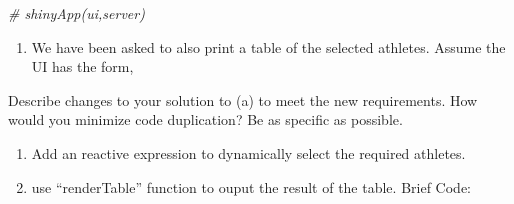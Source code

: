 \documentclass[
]{article}
\newenvironment{Shaded}{\begin{snugshade}}{\end{snugshade}}
\newcommand{\AlertTok}[1]{\textcolor[rgb]{0.94,0.16,0.16}{#1}}
\newcommand{\CommentTok}[1]{\textcolor[rgb]{0.56,0.35,0.01}{\textit{#1}}}
\providecommand{\tightlist}{%
  \setlength{\itemsep}{0pt}\setlength{\parskip}{0pt}}
\begin{document}
\begin{Shaded}
\begin{Highlighting}[]
\CommentTok{\# shinyApp(ui,server)}
\end{Highlighting}
\end{Shaded}

\begin{enumerate}
\def\labelenumi{\alph{enumi}.}
\setcounter{enumi}{1}
\item
  We have been asked to also print a table of the selected athletes.
  Assume the UI has the form,

\begin{Shaded}
\end{Shaded}
\end{enumerate}

Describe changes to your solution to (a) to meet the new requirements.
How would you minimize code duplication? Be as specific as possible.

\begin{enumerate}
\def\labelenumi{\arabic{enumi}.}
\tightlist
\item
  Add an reactive expression to dynamically select the required
  athletes.
\item
  use ``renderTable'' function to ouput the result of the table. Brief
  Code:
\end{enumerate}

\begin{Shaded}
\end{Shaded}
\end{document}
